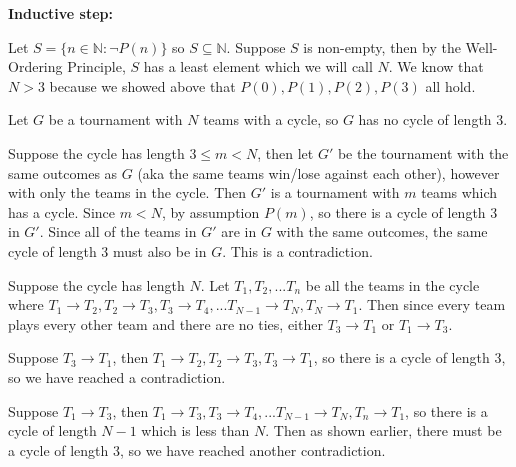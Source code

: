 \documentclass[12pt]{article}
\newcommand{\N}{\mathbb{N}}
\begin{document}
\noindent \textbf{Inductive step:}

Let $S = \{ n \in \N : \neg P(n) \}$ so $S \subseteq \N$. Suppose $S$ is non-empty, then by the Well-Ordering Principle, $S$ has a least element which we will call $N$. We know that $N > 3$ because we showed above that $P(0), P(1), P(2), P(3)$ all hold.

Let $G$ be a tournament with $N$ teams with a cycle, so $G$ has no cycle of length 3.

Suppose the cycle has length $3 \leq m < N$, then let $G'$ be the tournament with the same outcomes as $G$ (aka the same teams win/lose against each other), however with only the teams in the cycle. Then $G'$ is a tournament with $m$ teams which has a cycle. Since $m < N$, by assumption $P(m)$, so there is a cycle of length 3 in $G'$. Since all of the teams in $G'$ are in $G$ with the same outcomes, the same cycle of length 3 must also be in $G$. This is a contradiction.

\begin{center}
\end{center}

Suppose the cycle has length $N$. Let $T_1, T_2, ... T_n$ be all the teams in the cycle where $T_1 \rightarrow T_2, T_2 \rightarrow T_3, T_3 \rightarrow T_4, ... T_{N-1} \rightarrow T_N, T_N \rightarrow T_1$. Then since every team plays every other team and there are no ties, either {\color{red}$T_3 \rightarrow T_1$} or {\color{blue}$T_1 \rightarrow T_3$}.

Suppose {\color{red}$T_3 \rightarrow T_1$}, then $T_1 \rightarrow T_2, T_2 \rightarrow T_3, T_3 \rightarrow T_1$, so there is a cycle of length 3, so we have reached a contradiction.

Suppose {\color{blue}$T_1 \rightarrow T_3$}, then $T_1 \rightarrow T_3, T_3 \rightarrow T_4, ... T_{N-1} \rightarrow T_N, T_n \rightarrow T_1$, so there is a cycle of length $N - 1$ which is less than $N$. Then as shown earlier, there must be a cycle of length 3, so we have reached another contradiction.
\end{document}
